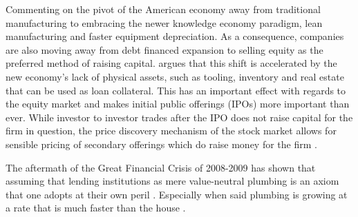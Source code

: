 	Commenting on the pivot of the American economy away from traditional manufacturing to embracing the newer knowledge economy paradigm, lean manufacturing and faster equipment depreciation.  As a consequence, companies are also moving away from debt financed expansion to selling equity as the preferred method of raising capital. 	\cite{Graves2003} argues that this shift is accelerated by the new economy's lack of physical assets, such as tooling, inventory and real estate that can be used as loan collateral. This has an important effect with regards to the equity market and makes initial public offerings (IPOs) more important than ever. While investor to investor trades after the IPO does not raise capital for the firm in question, the price discovery mechanism of the stock market allows for sensible pricing of secondary offerings which do raise money for the firm \citep{Tobin1969}.  
	
	
	The aftermath of the Great Financial Crisis of 2008-2009 has shown that assuming that lending institutions as mere value-neutral plumbing is an axiom that one adopts at their own peril \citep{Krugman2012blog}.  Especially when said plumbing is growing at a rate that is much faster than the house .  
	
	
	
	